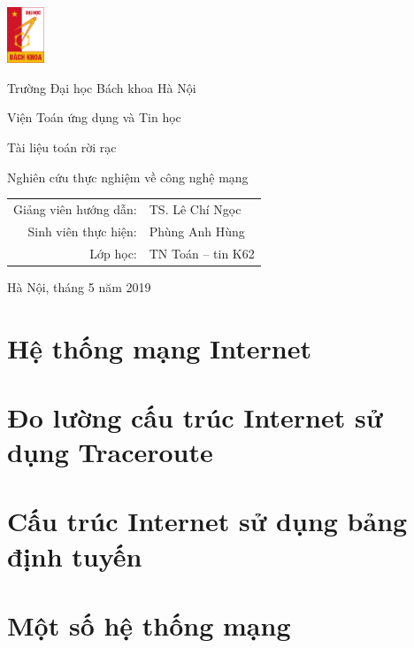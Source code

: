 


\pagestyle{plain}
\pagestyle{fancy}
\lhead{}

\begin{titlepage}
	\begin{minipage}[c]{4em}
		\includegraphics[width=3em]{res/bk.jpg}
	\end{minipage}
	\begin{minipage}[l]{\textwidth - 4em}
		{\Huge Trường Đại học Bách khoa Hà Nội\par}
		{\large Viện Toán ứng dụng và Tin học}
	\end{minipage}
	\vfill
	\vfill
	\begin{center}
		{\Large Tài liệu toán rời rạc}\par
		{\LARGE Nghiên cứu thực nghiệm về công nghệ mạng}\par
		\vfill
		{\large
			\begin{tabular}{rl}
				{ Giảng viên hướng dẫn}:&TS. Lê Chí Ngọc\\
				{ Sinh viên thực hiện:}& Phùng Anh Hùng\\
				{ Lớp học:} & TN Toán -- tin K62
			\end{tabular}
		}
		\vfill
		{\large Hà Nội, tháng 5 năm 2019}
	\end{center}
\end{titlepage}
\tableofcontents

\chapter{Hệ thống mạng Internet}


\chapter{Đo lường cấu trúc Internet sử dụng Traceroute}


\chapter{Cấu trúc Internet sử dụng bảng định tuyến}


\chapter{Một số hệ thống mạng}





